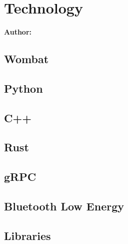 \chapter{Technology}

\textbf{Author: }

\section{Wombat}

\section{Python}

\section{C++}

\section{Rust}

\section{gRPC}

\section{Bluetooth Low Energy}

\section{Libraries}

\filbreak
